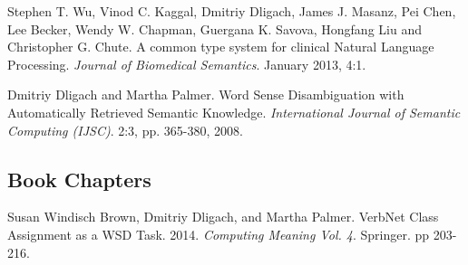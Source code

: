 \documentclass[letterpaper]{article}
\renewenvironment{itemize}{
  \begin{list}{}{
    \setlength{\leftmargin}{1.5em}
  }
}{
  \end{list}
}
\begin{document}
\begin{itemize}
\item Stephen T. Wu, Vinod C. Kaggal, Dmitriy Dligach, James J. Masanz, Pei Chen, Lee Becker, Wendy W. Chapman, Guergana K. Savova, Hongfang Liu and Christopher G. Chute. A common type system for clinical Natural Language Processing. \emph{Journal of Biomedical Semantics}. January 2013, 4:1.
\item Dmitriy Dligach and Martha Palmer. Word Sense Disambiguation with Automatically Retrieved Semantic Knowledge. \emph {International Journal of Semantic Computing (IJSC)}. 2:3, pp. 365-380, 2008.
\end{itemize}

\subsection*{Book Chapters}
\begin{itemize}
\item Susan Windisch Brown, Dmitriy Dligach, and Martha Palmer. VerbNet Class Assignment as a WSD Task. 2014. \emph{Computing Meaning Vol. 4}. Springer. pp 203-216.
\end{itemize}
\end{document}
